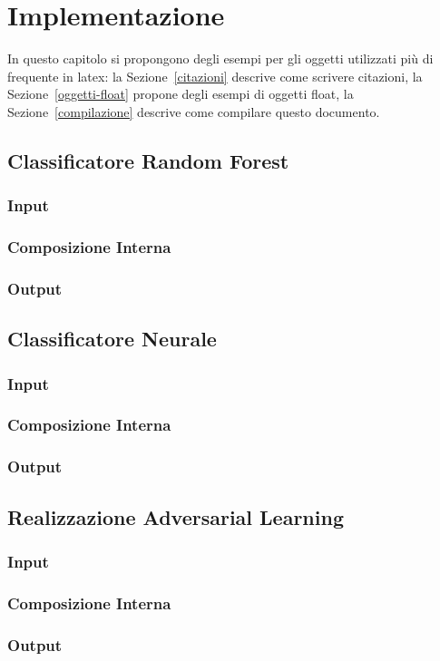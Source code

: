 \chapter{Implementazione}
\label{implementazione}

In questo capitolo si propongono degli esempi per gli oggetti utilizzati più di frequente in latex: la Sezione~\ref{citazioni} descrive come scrivere citazioni, la Sezione~\ref{oggetti-float} propone degli esempi di oggetti float, la Sezione~\ref{compilazione} descrive come compilare questo documento.

\section{Classificatore Random Forest}
\label{imprandomforest}

\subsection{Input}
\label{imprandomforestinput}

\subsection{Composizione Interna}
\label{imprandomforestinterno}

\subsection{Output}
\label{imprandomforestoutput}

\section{Classificatore Neurale}
\label{impclassificatorenn}

\subsection{Input}
\label{impclassificatorenninput}

\subsection{Composizione Interna}
\label{impclassificatorenninterno}

\subsection{Output}
\label{impclassificatorennoutput}

\section{Realizzazione Adversarial Learning}
\label{impadv}

\subsection{Input}
\label{impadvinput}

\subsection{Composizione Interna}
\label{impadvinterno}

\subsection{Output}
\label{impadvoutput}